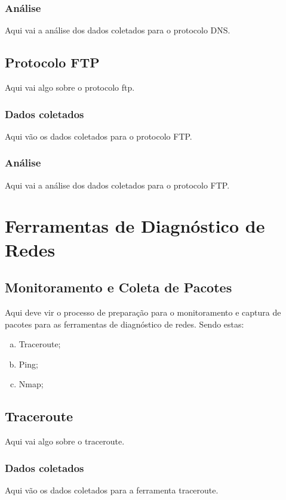\documentclass[a4paper]{report} %
\begin{document}
\subsection{Análise}
\label{sub_dns_analise}
Aqui vai a análise dos dados coletados para o protocolo DNS.

\section{Protocolo FTP}
\label{sec_ftp}
Aqui vai algo sobre o protocolo ftp.
\subsection{Dados coletados}
\label{sub_ftp_dados}
Aqui vão os dados coletados para o protocolo FTP.

\subsection{Análise}
\label{sub_ftp_analise}
Aqui vai a análise dos dados coletados para o protocolo FTP.

\chapter{Ferramentas de Diagnóstico de Redes}
\label{chap_segundo}

\section{Monitoramento e Coleta de Pacotes}
\label{sec_segundo_monitoramento}

Aqui deve vir o processo de preparação para o monitoramento e captura de pacotes para as ferramentas de
diagnóstico de redes. Sendo estas:
\begin{enumerate}[a)]
 \item Traceroute;
 \item Ping;
 \item Nmap;
\end{enumerate}

\section{Traceroute}
\label{sec_traceroute}
Aqui vai algo sobre o traceroute.
\subsection{Dados coletados}
\label{sub_traceroute_dados}
Aqui vão os dados coletados para a ferramenta traceroute.
\end{document}
